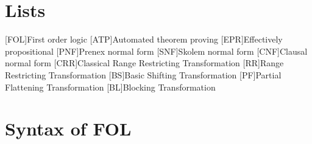 \appendix
\renewcommand{\appendixtocname}{Appendix}
\renewcommand{\appendixpagename}{\appendixtocname}
\addappheadtotoc
{}
\appendixpage

\chapter{Lists}
\begin{acronym}[\hspace{3cm}]
  [FOL]{First order logic}
  [ATP]{Automated theorem proving}
  [EPR]{Effectively propositional}
  [PNF]{Prenex normal form}
  [SNF]{Skolem normal form}
  [CNF]{Clausal normal form}
  [CRR]{Classical Range Restricting Transformation}
  [RR]{Range Restricting Transformation}
  [BS]{Basic Shifting Transformation}
  [PF]{Partial Flattening Transformation}
  [BL]{Blocking Transformation}
\end{acronym}
\clearpage

\listoffigures
{}

\listoftables
{}

\lstlistoflistings
{}

\listofalgorithms
{}


\chapter{Syntax of FOL}\label{chap:appendix_fol}
